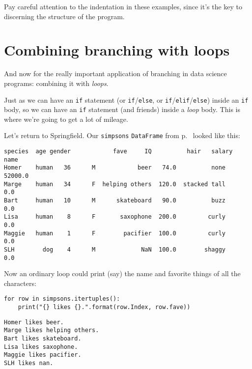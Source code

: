 
Pay careful attention to the indentation in these examples, since it's the key
to discerning the structure of the program.


\section{Combining branching with loops}


And now for the really important application of branching in data science
programs: combining it with \textit{loops}.

Just as we can have an \texttt{if} statement (or \texttt{if}/\texttt{else}, or
\texttt{if}/\texttt{elif}/\texttt{else}) inside an \texttt{if} body, so we can
have an \texttt{if} statement (and friends) inside a \textit{loop} body. This
is where we're going to get a lot of mileage.

Let's return to Springfield. Our \texttt{simpsons} \texttt{DataFrame} from
p.~\pageref{finalSimpsons} looked like this:

\begin{Verbatim}[fontsize=\scriptsize,samepage=true,frame=leftline,framesep=5mm,framerule=1mm]
       species  age gender            fave     IQ          hair   salary
name                                                                    
Homer    human   36      M            beer   74.0          none  52000.0
Marge    human   34      F  helping others  120.0  stacked tall      0.0
Bart     human   10      M      skateboard   90.0          buzz      0.0
Lisa     human    8      F       saxophone  200.0         curly      0.0
Maggie   human    1      F        pacifier  100.0         curly      0.0
SLH        dog    4      M             NaN  100.0        shaggy      0.0
\end{Verbatim}

Now an ordinary loop could print (say) the name and favorite things of all the
characters:


\begin{Verbatim}[fontsize=\footnotesize,samepage=true,frame=single,framesep=3mm]
for row in simpsons.itertuples():
    print("{} likes {}.".format(row.Index, row.fave))
\end{Verbatim}
\vspace{-.2in}

\begin{Verbatim}[fontsize=\footnotesize,samepage=true,frame=leftline,framesep=5mm,framerule=1mm]
Homer likes beer.
Marge likes helping others.
Bart likes skateboard.
Lisa likes saxophone.
Maggie likes pacifier.
SLH likes nan.
\end{Verbatim}

